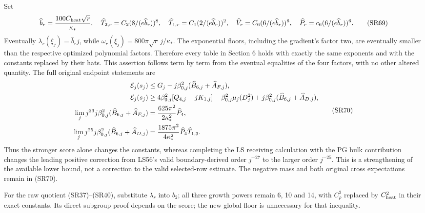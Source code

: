 \documentclass[11pt]{article}
\begin{document}
Set
\[
\widehat b_r={100C_{\rm heat}\sqrt r\over\kappa_*},\quad
\widehat T_{2,r}=C_2(8/(e\widehat b_r))^8,\quad
\widehat T_{1,r}=C_1(2/(e\widehat b_r))^2,\quad
\widehat V_r=C_6(6/(e\widehat b_r))^6,\quad
\widehat P_r=c_6(6/(e\widehat b_r))^6.
\tag{SR69}
\]
Eventually \(\lambda_r(\xi_j)=\widehat b_rj\), while \(\omega_r(\xi_j)=800\pi\sqrt r\,j/\kappa_*\). The exponential floors, including the gradient's factor two, are eventually smaller than the respective optimized polynomial factors. Therefore every table in Section 6 holds with exactly the same exponents and with the constants replaced by their hats. This assertion follows term by term from the eventual equalities of the four factors, with no other altered quantity. The full original endpoint statements are
\[
\begin{aligned}
\mathcal E_j(s_j)&\le G_j-j\beta_{0,j}^2(\widehat B_{6,j}+\widehat A_{F,j}),\\
\mathcal E_j(s_j)&\ge4\beta_{0,j}^2[Q_{4,j}-jK_{1,j}]-\beta_{0,j}^2\mu_j(D_j^2)
+j\beta_{0,j}^2(\widehat B_{6,j}+\widehat A_{D,j}),\\
\lim_jj^{23}j\beta_{0,j}^2(\widehat B_{6,j}+\widehat A_{F,j})
&={625\pi^2\over2\kappa_*^2}\widehat P_4,\\
\lim_jj^{25}j\beta_{0,j}^2(\widehat B_{6,j}+\widehat A_{D,j})
&={1875\pi^2\over4\kappa_*^2}\widehat P_4\widehat T_{1,3}.
\end{aligned}\tag{SR70}
\]
Thus the stronger score alone changes the constants, whereas completing the LS receiving calculation with the PG bulk contribution changes the leading positive correction from LS56's valid boundary-derived order \(j^{-27}\) to the larger order \(j^{-25}\). This is a strengthening of the available lower bound, not a correction to the valid selected-row estimate. The negative mass and both original cross expectations remain in (SR70).

For the raw quotient (SR37)–(SR40), substitute \(\lambda_r\) into \(b_2\); all three growth powers remain 6, 10 and 14, with \(C_\rho^2\) replaced by \(C_{\rm heat}^2\) in their exact constants. Its direct subgroup proof depends on the score; the new global floor is unnecessary for that inequality.
\end{document}
